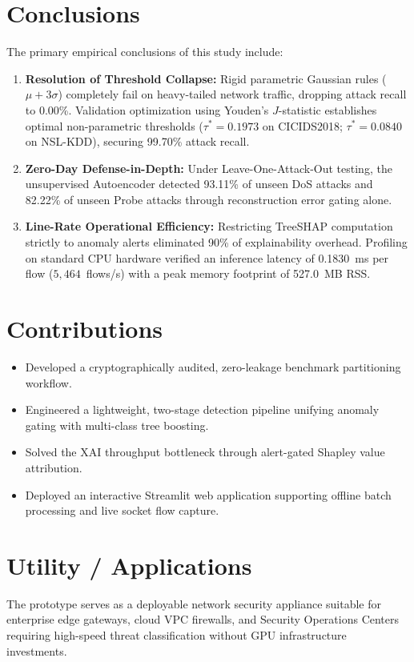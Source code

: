 \documentclass[12pt,a4paper]{report}
\begin{document}
\section{Conclusions}
The primary empirical conclusions of this study include:
\begin{enumerate}
    \item \textbf{Resolution of Threshold Collapse:} Rigid parametric Gaussian rules ($\mu + 3\sigma$) completely fail on heavy-tailed network traffic, dropping attack recall to 0.00\%. Validation optimization using Youden's $J$-statistic establishes optimal non-parametric thresholds ($\tau^* = 0.1973$ on CICIDS2018; $\tau^* = 0.0840$ on NSL-KDD), securing 99.70\% attack recall.
    \item \textbf{Zero-Day Defense-in-Depth:} Under Leave-One-Attack-Out testing, the unsupervised Autoencoder detected 93.11\% of unseen DoS attacks and 82.22\% of unseen Probe attacks through reconstruction error gating alone.
    \item \textbf{Line-Rate Operational Efficiency:} Restricting TreeSHAP computation strictly to anomaly alerts eliminated 90\% of explainability overhead. Profiling on standard CPU hardware verified an inference latency of 0.1830~ms per flow ($5{,}464$~flows/s) with a peak memory footprint of 527.0~MB RSS.
\end{enumerate}

\section{Contributions}
\begin{itemize}
    \item Developed a cryptographically audited, zero-leakage benchmark partitioning workflow.
    \item Engineered a lightweight, two-stage detection pipeline unifying anomaly gating with multi-class tree boosting.
    \item Solved the XAI throughput bottleneck through alert-gated Shapley value attribution.
    \item Deployed an interactive Streamlit web application supporting offline batch processing and live socket flow capture.
\end{itemize}

\section{Utility / Applications}
The prototype serves as a deployable network security appliance suitable for enterprise edge gateways, cloud VPC firewalls, and Security Operations Centers requiring high-speed threat classification without GPU infrastructure investments.
\end{document}
